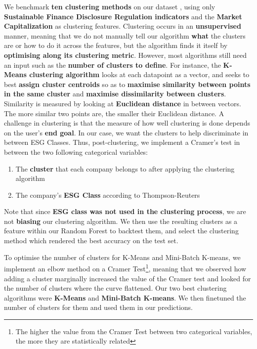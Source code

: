 \documentclass[12pt]{report}
\begin{document}
We benchmark \textbf{ten clustering methods} on our dataset \citep{handbookclustering}, using only \textbf{Sustainable Finance Disclosure Regulation indicators} and the \textbf{Market Capitalization} as clustering features.\newline
Clustering occurs in an \textbf{unsupervised} manner, meaning that we do not manually tell our algorithm \textbf{what} the clusters are or how to do it across the features, but the algorithm finds it itself by \textbf{optimising along its clustering metric}. However, most algorithms still need an input such as the \textbf{number of clusters to define}.\newline
For instance, the \textbf{K-Means clustering algorithm} looks at each datapoint as a vector, and seeks to best \textbf{assign cluster centroids} so as to \textbf{maximise similarity between points in the same cluster} and \textbf{maximise dissimilarity between clusters}. Similarity is measured by looking at \textbf{Euclidean distance} in between vectors. The more similar two points are, the smaller their Euclidean distance.\newline
A challenge in clustering is that the measure of how well clustering is done depends on the user's \textbf{end goal}. In our case, we want the clusters to help discriminate in between ESG Classes.
Thus, post-clustering, we implement a Cramer's test in between the two following categorical variables: 
\begin{enumerate}
\setlength\itemsep{0em}
    \item The \textbf{cluster} that each company belongs to after applying the clustering algorithm
    \item The company's \textbf{ESG Class} according to Thompson-Reuters
\end{enumerate}
Note that since \textbf{ESG class was not used in the clustering process}, we are not \textbf{biasing} our clustering algorithm. We then use the resulting clusters as a feature within our Random Forest to backtest them, and select the clustering method which rendered the best accuracy on the test set.

To optimise the number of clusters for K-Means and Mini-Batch K-means, we implement an elbow method on a Cramer Test\footnote{The higher the value from the Cramer Test between two categorical variables, the more they are statistically related}, meaning that we observed how adding a cluster marginally increased the value of the Cramer test and looked for the number of clusters where the curve flattened.
Our two best clustering algorithms were \textbf{K-Means} and \textbf{Mini-Batch K-means}. We then finetuned the number of clusters for them and used them in our predictions. 
\end{document}
